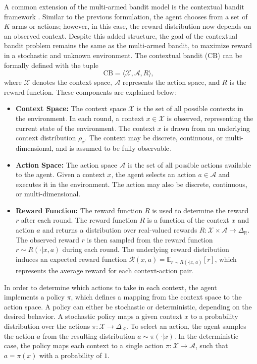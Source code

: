\documentclass[./dissertation.tex]{subfiles}
\begin{document}
A common extension of the multi-armed bandit model is the contextual bandit framework \parencite{CBandit}. Similar to the previous formulation, the agent chooses from a set of $K$ arms or actions; however, in this case, the reward distribution now depends on an observed context. Despite this added structure, the goal of the contextual bandit problem remains the same as the multi-armed bandit, to maximize reward in a stochastic and unknown environment. The contextual bandit (CB) can be formally defined with the tuple
\begin{equation}
\text{CB} = \langle \mathcal{X}, \mathcal{A}, R \rangle,
\end{equation}
where $\mathcal{X}$ denotes the context space, $\mathcal{A}$ represents the action space, and $R$ is the reward function. These components are explained below: 
\begin{itemize}

    \item \textbf{Context Space:} The context space $\mathcal{X}$ is the set of all possible contexts in the environment. In each round, a context $x \in \mathcal{X}$ is observed, representing the current state of the environment. The context $x$ is drawn from an underlying context distribution $\rho_x$. The context may be discrete, continuous, or multi-dimensional, and is assumed to be fully observable.

    \item \textbf{Action Space:} The action space $\mathcal{A}$ is the set of all possible actions available to the agent. Given a context $x$, the agent selects an action $a \in \mathcal{A}$ and executes it in the environment. The action may also be discrete, continuous, or multi-dimensional.

    \item \textbf{Reward Function:} The reward function $R$ is used to determine the reward $r$ after each round. The reward function $R$ is a function of the context $x$ and action $a$ and returns a distribution over real-valued rewards $R: \mathcal{X} \times \mathcal{A} \to \Delta_\mathbb{R}$. The observed reward $r$ is then sampled from the reward function $r \sim  R(\cdot|x,a)$ during each round. The underlying reward distribution induces an expected reward function $\mathcal{R}(x,a)=\mathbb{E}_{r \sim R(\cdot|x,a)}[r]$, which represents the average reward for each context-action pair.

\end{itemize}

In order to determine which actions to take in each context, the agent implements a policy $\pi$, which defines a mapping from the context space to the action space. A policy can either be stochastic or deterministic, depending on the desired behavior. A stochastic policy maps a given context $x$ to a probability distribution over the actions $\pi: \mathcal{X} \to \Delta_{\mathcal{A}}$. To select an action, the agent samples the action $a$ from the resulting distribution $a \sim \pi(\cdot|x)$. In the deterministic case, the policy maps each context to a single action $\pi: \mathcal{X} \to \mathcal{A}$, such that $a = \pi(x)$ with a probability of $1$.
\end{document}
